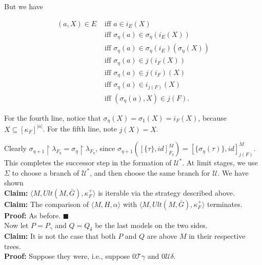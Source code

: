 \documentclass[12pt]{article}
\begin{document}
But we have

\[ 
\begin{split} 
(a, X) \in E & \text{  iff  }  a \in i_E(X)\\ 
& \text{  iff  } \sigma_\eta (a) \in \sigma_\eta (i_E (X)) \\
& \text{  iff  } \sigma_\eta (a) \in \sigma_\eta (i_E ) (\sigma_\eta (X))\\
& \text{  iff  } \sigma_\eta (a) \in j (i_F (X))\\
& \text{  iff  } \sigma_\eta (a) \in j(i_F)(X)\\
& \text{  iff  } \sigma_\eta (a) \in i_{j(F)}(X)\\
& \text{  iff  } (\sigma_\eta (a) , X) \in j(F).
\end{split}
\]

For the fourth line, notice that $\sigma_\eta (X) = \sigma_1 (X) = i_F (X)$, because $X \subseteq [\kappa_F ]^{|a|}$.  For the fifth line, note $j(X) = X$.

Clearly $\sigma_{\eta + 1} \restriction \lambda_{F_\eta} = \sigma_\eta \restriction \lambda_{F_\eta}$, since $\sigma_{\eta + 1} ( [ \{ \tau \} , id ]_{F_\eta}^M ) = [ \{ \sigma_\eta (\tau ) \} , id ]_{j (F)}^M $.\\


This completes the successor step in the formation of $\mathscr{U}^*$.  At limit stages, we use $\Sigma$ to choose a branch of $\mathscr{U}^*$, and then choose the same branch for $\mathscr{U}$.  We have shown\\

\textbf{Claim:}  $\langle M, Ult (M, \bar{G}) , \kappa_F^+ \rangle$ is iterable via the strategy described above.\\

\textbf{Claim:} The comparison of $\langle M, H, \alpha \rangle$ with $\langle M, Ult (M, \bar{G}) , \kappa_F^+ \rangle$ terminates.\\

\textbf{Proof:} As before. $\blacksquare$\\

Now let $P = P_\gamma$ and $Q = Q_\delta$ be the last models on the two sides.\\

\textbf{Claim:} It is not the case that both $P$ and $Q$ are above $M$ in their respective trees.\\

\textbf{Proof:}  Suppose they were, i.e., suppose $0 \mathscr{T} \gamma$ and $0 \mathscr{U} \delta$.\\
\end{document}
